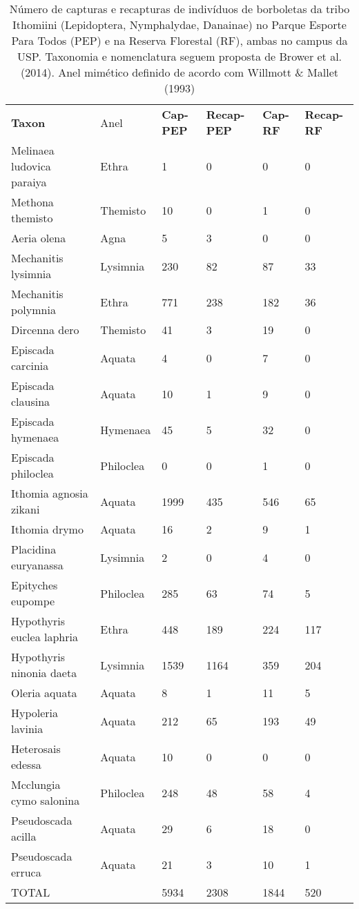 \begin{table}
\caption{\label{tab:borb1} Número de capturas e recapturas de indivíduos 
de borboletas da tribo
Ithomiini (Lepidoptera, Nymphalydae, Danainae) no Parque
Esporte Para Todos (PEP) e na Reserva Florestal (RF), ambas no campus da
USP. Taxonomia e nomenclatura seguem proposta de Brower et
al. (2014). Anel mimético definido de acordo com Willmott \& Mallet
(1993)}
\begin{tabular}[c]{@{}llllll@{}}
  \textbf{Taxon} & Anel & \textbf{Cap-PEP} & \textbf{Recap-PEP} & \textbf{Cap-RF} & \textbf{Recap-RF}\\
  Melinaea ludovica paraiya & Ethra & 1 & 0 & 0 & 0\\
  Methona themisto & Themisto & 10 & 0 & 1 & 0\\
  Aeria olena & Agna & 5 & 3 & 0 & 0\\
  Mechanitis lysimnia & Lysimnia & 230 & 82 & 87 & 33\\
  Mechanitis polymnia & Ethra & 771 & 238 & 182 & 36\\
  Dircenna dero & Themisto & 41 & 3 & 19 & 0\\
  Episcada carcinia & Aquata & 4 & 0 & 7 & 0\\
  Episcada clausina & Aquata & 10 & 1 & 9 & 0\\
  Episcada hymenaea & Hymenaea & 45 & 5 & 32 & 0\\
  Episcada philoclea & Philoclea & 0 & 0 & 1 & 0\\
  Ithomia agnosia zikani & Aquata & 1999 & 435 & 546 & 65\\
  Ithomia drymo & Aquata & 16 & 2 & 9 & 1\\
  Placidina euryanassa & Lysimnia & 2 & 0 & 4 & 0\\
  Epityches eupompe & Philoclea & 285 & 63 & 74 & 5\\
  Hypothyris euclea laphria & Ethra & 448 & 189 & 224 & 117\\
  Hypothyris ninonia daeta & Lysimnia & 1539 & 1164 & 359 & 204\\
  Oleria aquata & Aquata & 8 & 1 & 11 & 5\\
  Hypoleria lavinia & Aquata & 212 & 65 & 193 & 49\\
  Heterosais edessa & Aquata & 10 & 0 & 0 & 0\\
  Mcclungia cymo salonina & Philoclea & 248 & 48 & 58 & 4\\
  Pseudoscada acilla & Aquata & 29 & 6 & 18 & 0\\
  Pseudoscada erruca & Aquata & 21 & 3 & 10 & 1\\
  TOTAL & & 5934 & 2308 & 1844 & 520\\
\end{tabular} 
\end{table}